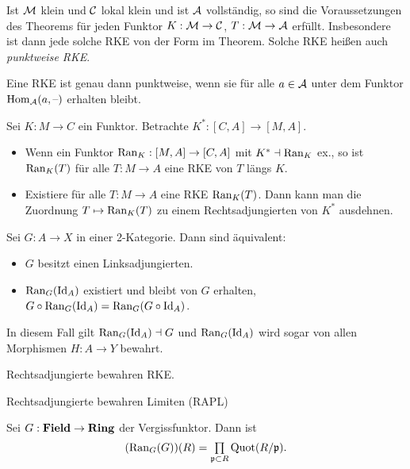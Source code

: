 \documentclass{cheat-sheet}
\DeclareMathOperator{\Quot}{Quot} %
\begin{document}
\begin{bem}
  Ist $\mathcal{M}$ klein und $\mathcal{C}$ lokal klein und ist $\mathcal{A}$ vollständig, so sind die Voraussetzungen des Theorems für jeden Funktor $K : \mathcal{M} \to \mathcal{C}$, $T : \mathcal{M} \to \mathcal{A}$ erfüllt. Insbesondere ist dann jede solche RKE von der Form im Theorem. Solche RKE heißen auch \emph{punktweise RKE}.
\end{bem}

\begin{lem}
  Eine RKE ist genau dann punktweise, wenn sie für alle $a \in \mathcal{A}$ unter dem Funktor $\operatorname{Hom}_{\mathcal{A}}(a, \text{--})$ erhalten bleibt.
\end{lem}

\begin{thm}
  Sei $K : M \to C$ ein Funktor. Betrachte $K^* : [C, A] \to [M, A]$.
  \begin{itemize}
    \item Wenn ein Funktor $\operatorname{Ran}_K : [M,A] \to [C, A]$ mit $K^* \dashv \operatorname{Ran}_K$ ex., so ist $\operatorname{Ran}_K(T)$ für alle $T : M \!\to\! A$ eine RKE von $T$ längs $K$.
    \item Existiere für alle $T : M \to A$ eine RKE $\operatorname{Ran}_K(T)$. Dann kann man die Zuordnung $T \mapsto \operatorname{Ran}_K(T)$ zu einem Rechtsadjungierten von $K^*$ ausdehnen.
  \end{itemize}
\end{thm}

\begin{thm}
  Sei $G : A \to X$ in einer 2-Kategorie. Dann sind äquivalent:
  \begin{itemize}
    \item $G$ besitzt einen Linksadjungierten.
    \item $\operatorname{Ran}_G(\operatorname{Id}_A)$ existiert und bleibt von $G$ erhalten, \dh{} $G \circ \operatorname{Ran}_G(\operatorname{Id}_A) = \operatorname{Ran}_G(G \circ \operatorname{Id}_A)$.
  \end{itemize}
  In diesem Fall gilt $\operatorname{Ran}_G(\operatorname{Id}_A) \dashv G$ und $\operatorname{Ran}_G(\operatorname{Id}_A)$ wird sogar von allen Morphismen $H : A \to Y$ bewahrt.
\end{thm}

\begin{thm}
  Rechtsadjungierte bewahren RKE.
\end{thm}

\begin{kor}
  Rechtsadjungierte bewahren Limiten (RAPL)
\end{kor}

\begin{bsp}
  Sei $G : \mathbf{Field} \to \mathbf{Ring}$ der Vergissfunktor. Dann ist
  \[ (\Ran_G(G))(R) = \prod_{\mathfrak{p} \subset R} \Quot(R/{\mathfrak{p}}). \]
\end{bsp}
\end{document}
